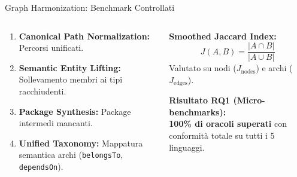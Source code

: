 \documentclass[aspectratio=169,10pt]{beamer}
\begin{document}
\begin{frame}{Graph Harmonization: Benchmark Controllati}
  \vspace{0.1em}
  \begin{columns}[c,onlytextwidth]
      \begin{cookiecard}[title={I 4 Pilastri di Graph-Synchron}]
        \small
        \begin{enumerate}\setlength{\itemsep}{0.2em}
          \item \textbf{Canonical Path Normalization:} Percorsi unificati.
          \item \textbf{Semantic Entity Lifting:} Sollevamento membri ai tipi racchiudenti.
          \item \textbf{Package Synthesis:} Package intermedi mancanti.
          \item \textbf{Unified Taxonomy:} Mappatura semantica archi (\texttt{belongsTo}, \texttt{dependsOn}).
        \end{enumerate}
      \end{cookiecard}

      \begin{cookiecard}[title={Metrica di Similarità \& RQ1}]
        \small \textbf{Smoothed Jaccard Index:}
        $$J(A, B) = \frac{|A \cap B|}{|A \cup B|}$$
        Valutato su nodi ($J_{\text{nodes}}$) e archi ($J_{\text{edges}}$).
        \vspace{0.3em}\par
        \textbf{Risultato RQ1 (Micro-benchmarks):}\\
        \textbf{\color{metricGreen}100\% di oracoli superati} con conformità totale su tutti i 5 linguaggi.
      \end{cookiecard}
  \end{columns}

\end{frame}
\end{document}
